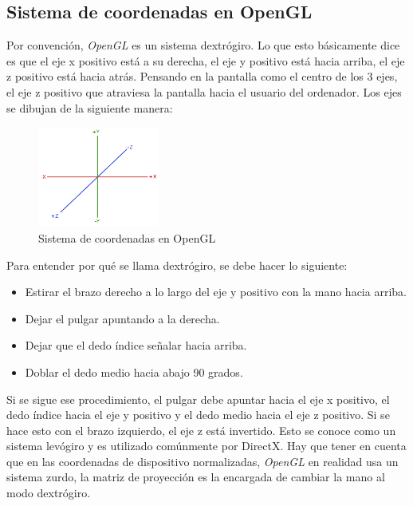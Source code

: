 \documentclass[a4paper]{book}
\begin{document}
\subsection{Sistema de coordenadas en OpenGL}
\label{subsec:SysOpenGL}

Por convención, \textit{OpenGL} es un sistema dextrógiro. Lo que esto básicamente dice es que el eje x positivo está a su derecha, el eje y
positivo está hacia arriba, el eje z positivo está hacia atrás. Pensando en la pantalla como el centro de los 3 ejes, el eje z positivo
que atraviesa la pantalla hacia el usuario del ordenador. Los ejes se dibujan de la siguiente manera:

\begin{figure}[H]
    \centering
    \includegraphics[width=4cm, keepaspectratio]{img/coordinate_systems_right_handed.png}
    \caption{Sistema de coordenadas en OpenGL}
    \label{coordinate_systems_right_handed}
\end{figure}

Para entender por qué se llama dextrógiro, se debe hacer lo siguiente:

\begin{itemize}
  \item Estirar el brazo derecho a lo largo del eje y positivo con la mano hacia arriba.
  \item Dejar el pulgar apuntando a la derecha.
  \item Dejar que el dedo índice señalar hacia arriba.
  \item Doblar el dedo medio hacia abajo 90 grados.
\end{itemize}

Si se sigue ese procedimiento, el pulgar debe apuntar hacia el eje x positivo, el dedo índice hacia
el eje y positivo y el dedo medio hacia el eje z positivo. Si se hace esto con el brazo izquierdo,
el eje z está invertido. Esto se conoce como un sistema levógiro y es utilizado comúnmente por DirectX.
Hay que tener en cuenta que en las coordenadas de dispositivo normalizadas, \textit{OpenGL} en realidad usa un
sistema zurdo, la matriz de proyección es la encargada de cambiar la mano al modo dextrógiro. \cite{opengl:_learn_opengl}
\end{document}
